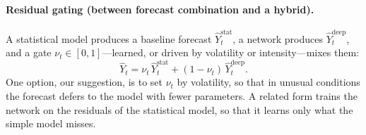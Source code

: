 \paragraph{Residual gating (between forecast combination and a hybrid).} A statistical model produces a baseline forecast $\widehat{Y}^{\text{stat}}_t$,
a network produces $\widehat{Y}^{\text{deep}}_t$, and a gate $\nu_t \in [0,1]$---learned, or driven by
volatility or intensity---mixes them:
\begin{equation}
  \widehat{Y}_t = \nu_t\, \widehat{Y}^{\text{stat}}_t + (1 - \nu_t)\, \widehat{Y}^{\text{deep}}_t .
\end{equation}
 One option, our suggestion, is to set $\nu_t$ by volatility,
so that in unusual conditions the forecast defers to the model with fewer parameters. A related form trains the
network on the residuals of the statistical model, so that it learns only what the simple model misses.

